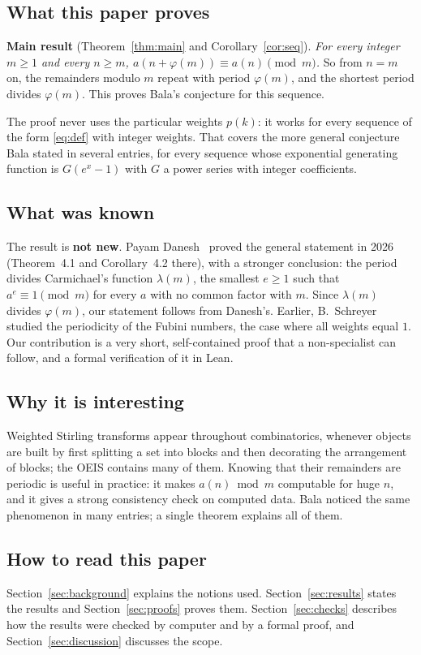 \documentclass[11pt,a4paper]{article}
\theoremstyle{definition}
\theoremstyle{remark}
\begin{document}
\subsection{What this paper proves}
\textbf{Main result} (Theorem~\ref{thm:main} and Corollary~\ref{cor:seq}). \emph{For every integer $m\ge1$ and every
$n\ge m$, $a(n+\varphi(m))\equiv a(n)\pmod m$.} So from $n=m$ on, the remainders modulo $m$ repeat with period
$\varphi(m)$, and the shortest period divides $\varphi(m)$. This proves Bala's conjecture for this sequence.

The proof never uses the particular weights $p(k)$: it works for every sequence of the form \eqref{eq:def} with
integer weights. That covers the more general conjecture Bala stated in several entries, for every sequence whose
exponential generating function is $G(e^x-1)$ with $G$ a power series with integer coefficients.

\subsection{What was known}
The result is \textbf{not new}. Payam Danesh~\cite{danesh} proved the general statement in 2026 (Theorem~4.1 and
Corollary~4.2 there), with a stronger conclusion: the period divides Carmichael's function $\lambda(m)$, the smallest
$e\ge1$ such that $a^e\equiv1\pmod m$ for every $a$ with no common factor with $m$. Since $\lambda(m)$ divides
$\varphi(m)$, our statement follows from Danesh's. Earlier, B.~Schreyer~\cite{schreyer} studied the periodicity of the
Fubini numbers, the case where all weights equal $1$. Our contribution is a very short, self-contained proof that a
non-specialist can follow, and a formal verification of it in Lean.

\subsection{Why it is interesting}
Weighted Stirling transforms appear throughout combinatorics, whenever objects are built by first splitting a set into
blocks and then decorating the arrangement of blocks; the OEIS contains many of them. Knowing that their remainders are
periodic is useful in practice: it makes $a(n)\bmod m$ computable for huge $n$, and it gives a strong consistency check
on computed data. Bala noticed the same phenomenon in many entries; a single theorem explains all of them.

\subsection{How to read this paper}
Section~\ref{sec:background} explains the notions used. Section~\ref{sec:results} states the results and
Section~\ref{sec:proofs} proves them. Section~\ref{sec:checks} describes how the results were checked by computer and by a
formal proof, and Section~\ref{sec:discussion} discusses the scope.
\end{document}
